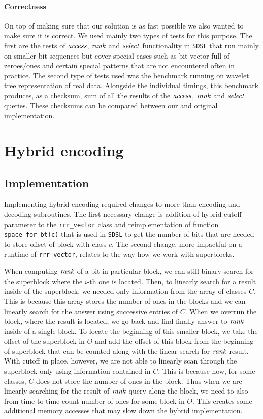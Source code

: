 \paragraph{Correctness}

On top of making sure that our solution is as fast possible we also wanted to make sure it is
correct. We used mainly two types of tests for this purpose. The first are the tests of $\mathit{access}$,
$\mathit{rank}$ and $\mathit{select}$ functionality in \texttt{SDSL} that run mainly on smaller bit sequences
but cover special cases such as bit vector full of zeroes/ones and certain special patterns
that are not encountered often in practice. The second type of tests used was the benchmark
running on wavelet tree representation of real data. Alongside the individual timings, this
benchmark produces, as a checksum, sum of all the results of the $\mathit{access}$, $\mathit{rank}$ and $\mathit{select}$
queries. These checksums can be compared between our and original implementation.

\section{Hybrid encoding}

\subsection{Implementation}

Implementing hybrid encoding required changes to more than encoding and decoding
subroutines. The first necessary change is addition of hybrid cutoff parameter
to the \texttt{rrr\_vector} class and reimplementation of function \texttt{space\_for\_bt(c)}
that is used in \texttt{SDSL} to get the number of bits that are needed to store offset
of block with class $c$. The second change, more impactful on a runtime
of \texttt{rrr\_vector}, relates to the way how we work with superblocks.

When computing $\mathit{rank}$ of a bit in particular block, we can still binary search for
the superblock where the $i$-th one is located. Then, to linearly search for a result
inside of the superblock, we needed only information from the array of classes $C$.
This is because this array stores the number of ones in the blocks and we can linearly
search for the answer using successive entries of $C$. When we overrun the block, where
the result is located, we go back and find finally answer to $\mathit{rank}$ inside of a single
block. To locate the beginning of this smaller block, we take the offset of the superblock
in $O$ and add the offset of this block from the beginning of superblock that can be
counted along with the linear search for $\mathit{rank}$ result. With cutoff in place, however,
we are not able to linearly scan through the superblock only using information contained
in $C$. This is because now, for some classes, $C$ does not store the number of ones in
the block. Thus when we are linearly searching for the result of $\mathit{rank}$ query along the
block, we need to also from time to time count number of ones for some block in $O$. This
creates some additional memory accesses that may slow down the hybrid implementation.

